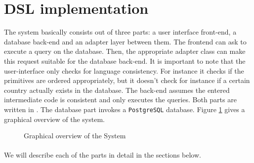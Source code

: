 \section{DSL implementation}
The system basically consists out of three parts: a user interface front-end, 
a database back-end and an adapter layer between them. The frontend can ask to 
execute a query on the database. Then, the appropriate adapter class can make this 
request suitable for the database back-end. It is important to note that
the user-interface only checks for language consistency. For instance it checks
if the primitives are ordered appropriately, but it doesn't check for instance if
a certain country actually exists in the database. The back-end assumes the
entered intermediate code is consistent and only executes the queries. Both
parts are written in \Csh{}. The database part invokes a \texttt{PostgreSQL}
database. Figure \ref{fig:systemOverview} gives a graphical overview of the system.
\begin{figure}[hbt]
\centering
{}
\caption{Graphical overview of the System}
\label{fig:systemOverview}
\end{figure}
\paragraph{}We will describe each of the parts in detail in the sections below.